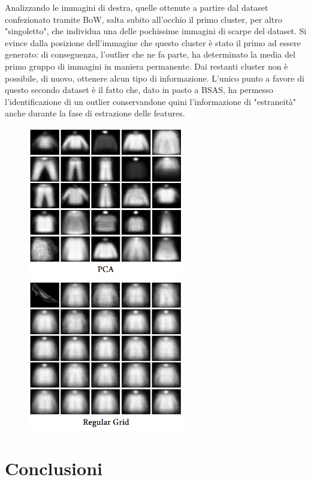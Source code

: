 \documentclass[]{report}
\begin{document}
	Analizzando le immagini di destra, quelle ottenute a partire dal dataset confezionato tramite BoW, salta subito all'occhio il primo cluster, per altro "singoletto", che individua una delle pochissime immagini di scarpe del dataset. Si evince dalla posizione dell'immagine che questo cluster è stato il primo ad essere generato: di conseguenza, l'outlier che ne fa parte, ha determinato la media del primo gruppo di immagini in maniera permanente. Dai restanti cluster non è possibile, di nuovo, ottenere alcun tipo di informazione. L'unico punto a favore di questo secondo dataset è il fatto che, dato in pasto a BSAS, ha permesso l'identificazione di un outlier conservandone quini l'informazione di "estraneità" anche durante la fase di estrazione delle features.

	\begin{figure}[ht!]
		\includegraphics[width=.49\textwidth,height=250px]{./img/BSAS_PCA}\hfill
		\includegraphics[width=.49\textwidth,height=250px]{./img/BSAS_RG}
	\end{figure}

	
	\section*{Conclusioni}
	
\end{document}
